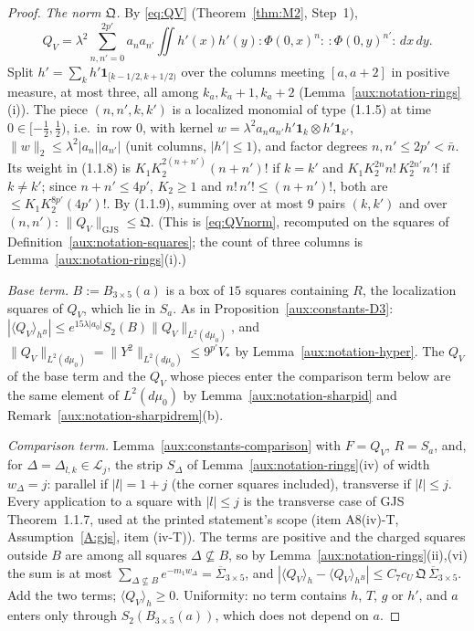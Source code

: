 \documentclass[11pt,a4paper]{article}
\theoremstyle{plain}
\theoremstyle{definition}
\theoremstyle{plain}
\theoremstyle{definition}
\newcommand{\GJS}[1]{\lVert #1\rVert_{\mathrm{GJS}}}   %
\newcommand{\ev}[2]{\langle #1\rangle_{#2}}            %
\newcommand{\dmu}{d\mu_0}
\begin{document}
\begin{proof}
\emph{The norm $\mathfrak Q$.}  By \eqref{eq:QV} (Theorem~\ref{thm:M2}, Step~1),
\[
 Q_V=\lambda^2\sum_{n,n'=0}^{2p'}a_na_{n'}\iint h'(x)h'(y)
 {:}\Phi(0,x)^n{:}\,{:}\Phi(0,y)^{n'}{:}\,dx\,dy .
\]
Split $h'=\sum_kh'\mathbf
1_{[k-1/2,k+1/2)}$ over the columns meeting $[a,a+2]$ in positive measure, at most three, all
among $k_a,k_a+1,k_a+2$ (Lemma~\ref{aux:notation-rings}(i)).  The piece $(n,n',k,k')$ is a
localized monomial of type (1.1.5) at time $0\in[-\frac12,\frac12)$, i.e.\ in row $0$, with
kernel $w=\lambda^2a_na_{n'}h'\mathbf 1_{k}\otimes h'\mathbf 1_{k'}$,
$\|w\|_2\le\lambda^2|a_n||a_{n'}|$ (unit columns, $|h'|\le1$), and factor degrees
$n,n'\le2p'<\bar n$.  Its weight in (1.1.8) is $K_1K_2^{2(n+n')}(n+n')!$ if $k=k'$ and
$K_1K_2^{2n}n!\,K_2^{2n'}n'!$ if $k\ne k'$; since $n+n'\le4p'$, $K_2\ge1$ and
$n!\,n'!\le(n+n')!$, both are $\le K_1K_2^{8p'}(4p')!$.  By (1.1.9), summing over at most $9$
pairs $(k,k')$ and over $(n,n')$: $\GJS{Q_V}\le\mathfrak Q$.  (This is \eqref{eq:QVnorm}, recomputed on the squares of Definition~\ref{aux:notation-squares}; the
count of three columns is Lemma~\ref{aux:notation-rings}(i).)

\emph{Base term.}  $B:=B_{3\times5}(a)$ is a box of $15$ squares containing $R$, the
localization squares of $Q_V$, which lie in $S_a$.  As in Proposition~\ref{aux:constants-D3}:
$|\ev{Q_V}{h^B}|\le e^{15\lambda|a_0|}S_2(B)\|Q_V\|_{L^2(\dmu)}$, and
$\|Q_V\|_{L^2(\dmu)}=\|Y^2\|_{L^2(\dmu)}\le9^{p'}V_*$ by Lemma~\ref{aux:notation-hyper}.  The
$Q_V$ of the base term and the $Q_V$ whose pieces enter the comparison term below are the same
element of $L^2(\dmu)$ by Lemma~\ref{aux:notation-sharpid} and
Remark~\ref{aux:notation-sharpidrem}(b).

\emph{Comparison term.}  Lemma~\ref{aux:constants-comparison} with $F=Q_V$, $R=S_a$, and, for
$\Delta=\Delta_{l,k}\in\mathcal L_j$, the strip $S_\Delta$ of Lemma~\ref{aux:notation-rings}(iv) of
width $w_\Delta=j$: parallel if $|l|=1+j$ (the corner squares included), transverse if
$|l|\le j$.  Every application to a square with $|l|\le j$ is the transverse case of GJS
Theorem~1.1.7, used at the printed statement's scope (item A8(iv)-T, Assumption~\ref{A:gjs}, item (iv-T)).  The
terms are positive and the charged squares outside $B$ are among all squares $\Delta\not\subseteq
B$, so by Lemma~\ref{aux:notation-rings}(ii),(vi) the sum is at most
$\sum_{\Delta\not\subseteq B}e^{-m_1w_\Delta}=\overline\Sigma_{3\times5}$, and
$|\ev{Q_V}h-\ev{Q_V}{h^B}|\le C_7c_U\,\mathfrak Q\,\overline\Sigma_{3\times5}$.  Add the two
terms; $\ev{Q_V}h\ge0$.  Uniformity: no
term contains $h$, $T$, $g$ or $h'$, and $a$ enters only through $S_2(B_{3\times5}(a))$, which
does not depend on $a$.
\end{proof}
\end{document}
